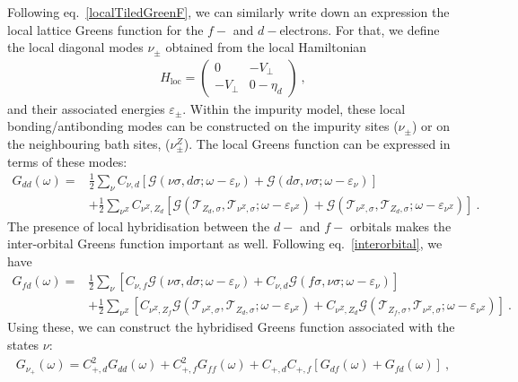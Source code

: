 \documentclass[%
reprint,
superscriptaddress,
groupedaddress,
superscriptaddress,
onecolumn,
10pt
]{revtex4-2}
\begin{document}
Following eq.~\ref{localTiledGreenF}, we can similarly write down an expression the local lattice Greens function for the \(f-\) and \(d-\)electrons. For that, we define the local diagonal modes \(\nu_\pm\) obtained from the local Hamiltonian
\begin{equation}\begin{aligned}
	H_\text{loc} = \begin{pmatrix} 0  & -V_\perp\\ -V_\perp & 0 - \eta_d \end{pmatrix}~,
\end{aligned}\end{equation}
and their associated energies \(\varepsilon_\pm\). Within the impurity model, these local bonding/antibonding modes can be constructed on the impurity sites (\(\nu_\pm\)) or on the neighbouring bath sites, (\(\nu^Z_\pm\)). The local Greens function can be expressed in terms of these modes:
\begin{equation}\begin{aligned}
	G_{dd}(\omega) =& \frac{1}{2}\sum_{\nu}C_{\nu, d} \left[\mathcal{G}(\nu\sigma, d\sigma; \omega - \varepsilon_{\nu}) + \mathcal{G}(d\sigma, \nu\sigma; \omega - \varepsilon_{\nu})\right]\\
								  &+ \frac{1}{2}\sum_{\nu^Z}C_{\nu^Z, Z_d} \left[\mathcal{G}(\mathcal{T}_{Z_d, \sigma}, \mathcal{T}_{\nu^Z,\sigma}; \omega - \varepsilon_{\nu^Z}) + \mathcal{G}(\mathcal{T}_{\nu^Z,\sigma}, \mathcal{T}_{Z_d, \sigma}; \omega - \varepsilon_{\nu^Z})\right]~.
\end{aligned}\end{equation}
The presence of local hybridisation between the \(d-\) and \(f-\) orbitals makes the inter-orbital Greens function important as well. Following eq.~\ref{interorbital}, we have
\begin{equation}\begin{aligned}
	G_{fd}(\omega) =& \frac{1}{2}\sum_{\nu} \left[C_{\nu, f}\mathcal{G}(\nu\sigma, d\sigma; \omega - \varepsilon_{\nu}) + C_{\nu,d}\mathcal{G}(f\sigma, \nu\sigma; \omega - \varepsilon_{\nu})\right]\\
								  &+ \frac{1}{2}\sum_{\nu^Z}\left[C_{\nu^Z, Z_f}\mathcal{G}(\mathcal{T}_{\nu^Z,\sigma}, \mathcal{T}_{Z_d, \sigma}; \omega - \varepsilon_{\nu^Z}) + C_{\nu^Z, Z_d} \mathcal{G}(\mathcal{T}_{Z_f, \sigma}, \mathcal{T}_{\nu^Z,\sigma}; \omega - \varepsilon_{\nu^Z})\right]~.
\end{aligned}\end{equation}
Using these, we can construct the hybridised Greens function associated with the states \(\nu\):
\begin{equation}\begin{aligned}
	G_{\nu_+}(\omega) = C_{+,d}^2 G_{dd}(\omega) + C_{+,f}^2 G_{ff}(\omega) + C_{+,d}C_{+,f}\left[ G_{df}(\omega) + G_{fd}(\omega)\right]~,
\end{aligned}\end{equation}
\end{document}
